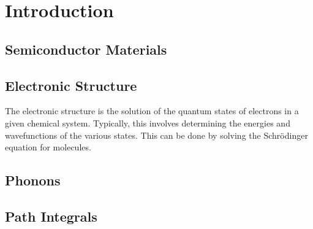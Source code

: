 
\chapter{Introduction} %

\label{Chapter1} %


\section{Semiconductor Materials}







\section{Electronic Structure}

The electronic structure is the solution of the quantum states of electrons in a given chemical system. Typically, this involves determining the energies and wavefunctions of the various states. This can be done by solving the Schr{\"o}dinger equation for molecules.




\section{Phonons}





\section{Path Integrals}





